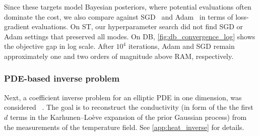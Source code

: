 \documentclass{article} %
\numberwithin{equation}{subsection}
\numberwithin{theorem}{section}
\begin{document}
Since these targets model Bayesian posteriors, where potential evaluations often dominate the cost, we also compare against SGD~\cite{amari1993backpropagation} and Adam~\cite{kingma2014adam} in terms of loss-gradient evaluations. 
On ST, our hyperparameter search did not find SGD or Adam settings that preserved all modes. 
On DB, \autoref{fig:db_convergence_log} shows the objective gap in log scale. 
After \(10^4\) iterations, Adam and SGD remain approximately one and
two orders of magnitude above RAM, respectively.

\subsubsection{PDE-based inverse problem}
Next, a coefficient inverse problem for an elliptic PDE in one dimension, was considered  ~\cite{roberts2026propagating}. 
The goal is to reconstruct the conductivity (in form of the the first $d$ terms in the Karhunen--Lo\`eve expansion of the prior Gaussian process) from the measurements of the temperature field.
See \autoref{app:heat_inverse} for details.
\end{document}
